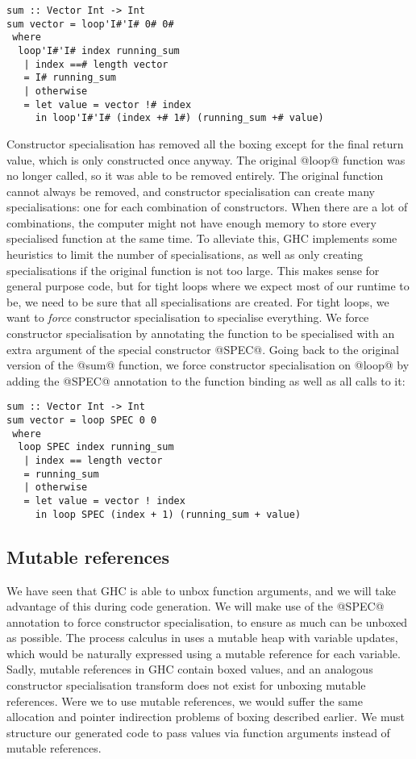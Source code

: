 \begin{lstlisting}
sum :: Vector Int -> Int
sum vector = loop'I#'I# 0# 0#
 where
  loop'I#'I# index running_sum
   | index ==# length vector
   = I# running_sum
   | otherwise
   = let value = vector !# index
     in loop'I#'I# (index +# 1#) (running_sum +# value)
\end{lstlisting}

Constructor specialisation has removed all the boxing except for the final return value, which is only constructed once anyway.
The original @loop@ function was no longer called, so it was able to be removed entirely.
The original function cannot always be removed, and constructor specialisation can create many specialisations: one for each combination of constructors.
When there are a lot of combinations, the computer might not have enough memory to store every specialised function at the same time.
To alleviate this, GHC implements some heuristics to limit the number of specialisations, as well as only creating specialisations if the original function is not too large.
This makes sense for general purpose code, but for tight loops where we expect most of our runtime to be, we need to be sure that all specialisations are created.
For tight loops, we want to \emph{force} constructor specialisation to specialise everything.
We force constructor specialisation by annotating the function to be specialised with an extra argument of the special constructor @SPEC@.
Going back to the original version of the @sum@ function, we force constructor specialisation on @loop@ by adding the @SPEC@ annotation to the function binding as well as all calls to it:

\begin{lstlisting}
sum :: Vector Int -> Int
sum vector = loop SPEC 0 0
 where
  loop SPEC index running_sum
   | index == length vector
   = running_sum
   | otherwise
   = let value = vector ! index
     in loop SPEC (index + 1) (running_sum + value)
\end{lstlisting}

\subsection{Mutable references}
\label{ss:extraction:mutablerefs}

We have seen that GHC is able to unbox function arguments, and we will take advantage of this during code generation.
We will make use of the @SPEC@ annotation to force constructor specialisation, to ensure as much can be unboxed as possible.
The process calculus in  uses a mutable heap with variable updates, which would be naturally expressed using a mutable reference for each variable.
Sadly, mutable references in GHC contain boxed values, and an analogous constructor specialisation transform does not exist for unboxing mutable references.
Were we to use mutable references, we would suffer the same allocation and pointer indirection problems of boxing described earlier.
We must structure our generated code to pass values via function arguments instead of mutable references.

